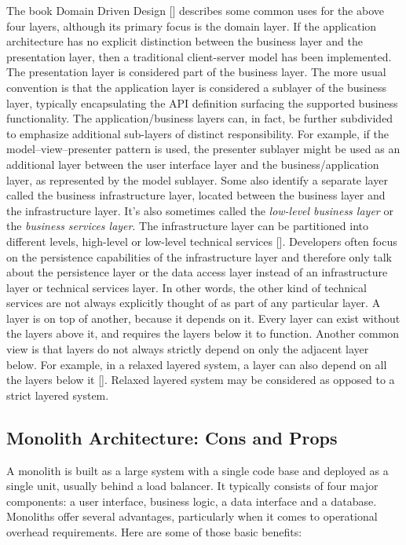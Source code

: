 The book Domain Driven Design [\cite{solvberg2010domain}] describes some common uses for the above four layers, although its primary focus is the
domain layer.
If the application architecture has no explicit distinction between the business layer and the presentation layer,
then a traditional client-server model has been implemented.
The presentation layer is considered part of the business layer.
The more usual convention is that the application layer is considered a sublayer of the business layer,
typically encapsulating the API definition surfacing the supported business functionality.
The application/business layers can, in fact, be further subdivided to emphasize additional sub-layers of distinct
responsibility.
For example, if the model–view–presenter pattern is used, the presenter sublayer might be used as an additional layer
between the user interface layer and the business/application layer, as represented by the model sublayer.
Some also identify a separate layer called the business infrastructure layer, located between the business layer
and the infrastructure layer.
It's also sometimes called the \textit{low-level business layer} or the \textit{business services layer}.
The infrastructure layer can be partitioned into different levels, high-level or low-level technical services [\cite{dennis2018mcapl}].
Developers often focus on the persistence capabilities of the infrastructure layer and therefore only
talk about the persistence layer or the data access layer instead of an infrastructure layer or technical services layer.
In other words, the other kind of technical services are not always explicitly thought of as part of any particular layer.
A layer is on top of another, because it depends on it.
Every layer can exist without the layers above it, and requires the layers below it to function.
Another common view is that layers do not always strictly depend on only the adjacent layer below.
For example, in a relaxed layered system, a layer can also depend on all the layers below it [\cite{anon2014building}].
Relaxed layered system may be considered as opposed to a strict layered system.

\subsection{Monolith Architecture: Cons and Props}\label{subsec:monolith-architecture:-cons-and-props}

A monolith is built as a large system with a single code base and deployed as a single unit, usually behind a load balancer.
It typically consists of four major components: a user interface, business logic, a data interface and a database.
Monoliths offer several advantages, particularly when it comes to operational overhead requirements.
Here are some of those basic benefits:

